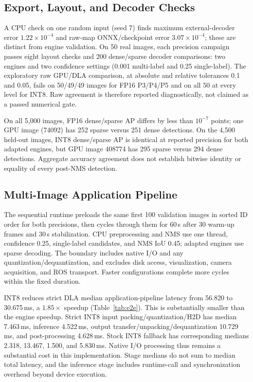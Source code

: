 \subsection{Export, Layout, and Decoder Checks}
\label{sec:parity}
A CPU check on one random input (seed 7) finds maximum external-decoder error
$1.22\times10^{-4}$ and raw-map ONNX/checkpoint error $3.07\times10^{-4}$;
these are distinct from engine validation. On 50 real images, each
precision campaign passes eight layout checks and 200 dense/sparse decoder
comparisons: two engines and two confidence settings (0.001 multi-label and
0.25 single-label). The exploratory raw GPU/DLA comparison, at absolute
and relative tolerances 0.1 and 0.05, fails on 50/49/49 images for FP16
P3/P4/P5 and on all 50 at every level for INT8. Raw agreement is therefore
reported diagnostically, not claimed as a passed numerical gate.

On all 5,000 images, FP16 dense/sparse AP differs by less than $10^{-7}$
points; one GPU image (74092) has 252 sparse versus 251 dense detections.
On the 4,500 held-out images, INT8 dense/sparse AP is identical at reported
precision for both adapted engines, but GPU image 408774 has 295 sparse
versus 294 dense detections. Aggregate accuracy agreement does not establish
bitwise identity or equality of every post-NMS detection.

\subsection{Multi-Image Application Pipeline}
\label{sec:application}
The sequential runtime preloads the same first 100 validation images in sorted
ID order for both precisions, then cycles through them for 60\,s after 30
warm-up frames and 30\,s stabilization. CPU preprocessing and NMS use one
thread, confidence 0.25, single-label candidates, and NMS IoU 0.45; adapted
engines use sparse decoding.
The boundary includes native I/O and any quantization/dequantization, and
excludes disk access, visualization, camera acquisition, and ROS transport.
Faster configurations complete more cycles within the fixed duration.


INT8 reduces strict DLA median application-pipeline latency from 56.820 to 30.675\,ms,
a $1.85\times$ speedup (Table~\ref{tab:e2e}). This is substantially smaller
than the engine speedup. Strict INT8 input packing/quantization/H2D has median
7.463\,ms, inference 4.522\,ms, output transfer/unpacking/dequantization
10.729\,ms, and post-processing 4.628\,ms. Stock INT8 fallback has corresponding
medians 2.318, 13.467, 1.500, and 5.830\,ms. Native I/O processing thus remains
a substantial cost in this implementation. Stage medians do not sum to median
total latency, and the inference stage includes runtime-call and synchronization
overhead beyond device execution.

